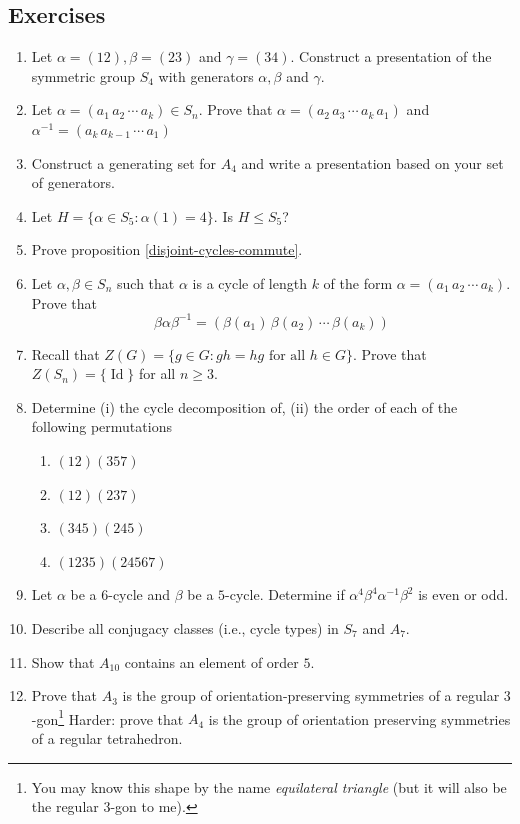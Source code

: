 \documentclass[12pt]{article}
\numberwithin{equation}{subsection}
\theoremstyle{note}
\newcommand{\Id}{\operatorname{Id}}
\begin{document}
\subsection{Exercises}
\begin{enumerate}[label=\arabic*.]
	\item Let $\alpha=(12), \beta=(23)$ and $\gamma=(34)$. Construct a presentation of the symmetric group $S_4$ with generators $\alpha,\beta$ and $\gamma$. 
	\item Let $\alpha=(a_1\,a_2\,\cdots\,a_k)\in S_n$. Prove that $\alpha=(a_2 \, a_3\, \cdots\, a_k \, a_1)$ and $\alpha^{-1}=(a_k\, a_{k-1}\, \cdots\, a_1)$
	\item Construct a generating set for $A_4$ and write a presentation based on your set of generators. 
	\item Let $H=\{\alpha\in S_5 : \alpha(1)=4\}$. Is $H\leq S_5$?
	\item Prove proposition \ref{disjoint-cycles-commute}.
	\item Let $\alpha,\beta\in S_n$ such that  $\alpha$ is a cycle of length $k$ of the form $\alpha=(a_1\,a_2\,\cdots \, a_k)$. Prove that  \[\beta\alpha\beta^{-1}=(\beta(a_1) \, \beta(a_2)\, \cdots \, \beta(a_k))\]
	\item Recall that $Z(G)=\{ g\in G : gh=hg \text{ for all $h\in G$}\}$. Prove that $Z(S_n)=\{\Id\}$ for all $n\geq 3$.
	\item Determine (i) the cycle decomposition of, (ii) the order of each of the following permutations \begin{enumerate}
		\item $(12)(357)$
		\item $(12)(237)$
		\item $(345)(245)$
		\item $(1235)(24567)$
	\end{enumerate}
	\item Let $\alpha$ be a $6$-cycle and $\beta$ be a $5$-cycle. Determine if $\alpha^4\beta^4\alpha^{-1}\beta^2$ is even or odd.
	\item Describe all conjugacy classes (i.e., cycle types) in $S_7$ and $A_7$. 
	\item Show that $A_{10}$ contains an element of order $5$. 
	\item Prove that $A_3$ is the group of orientation-preserving symmetries of a regular $3$-gon\footnote{You may know this shape by the name \textit{equilateral triangle} (but it will also be the regular 3-gon to me).} Harder: prove that $A_4$ is the group of orientation preserving symmetries of a regular tetrahedron. \

\end{enumerate}
\end{document}
